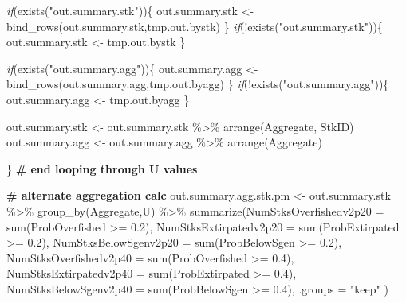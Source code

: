\documentclass[french,11pt]{book}
\newenvironment{Shaded}{\begin{snugshade}}{\end{snugshade}}
\newcommand{\AttributeTok}[1]{\textcolor[rgb]{0.77,0.63,0.00}{#1}}
\newcommand{\CommentTok}[1]{\textcolor[rgb]{0.56,0.35,0.01}{\textbf{#1}}}
\newcommand{\ControlFlowTok}[1]{\textcolor[rgb]{0.13,0.29,0.53}{\textit{#1}}}
\newcommand{\FloatTok}[1]{\textcolor[rgb]{0.00,0.00,0.81}{#1}}
\newcommand{\FunctionTok}[1]{\textcolor[rgb]{0.00,0.00,0.00}{#1}}
\newcommand{\NormalTok}[1]{#1}
\newcommand{\OtherTok}[1]{\textcolor[rgb]{0.56,0.35,0.01}{#1}}
\newcommand{\SpecialCharTok}[1]{\textcolor[rgb]{0.00,0.00,0.00}{#1}}
\newcommand{\StringTok}[1]{\textcolor[rgb]{0.31,0.60,0.02}{#1}}
\begin{document}
\begin{Shaded}
\begin{Highlighting}[]
    \ControlFlowTok{if}\NormalTok{(}\FunctionTok{exists}\NormalTok{(}\StringTok{"out.summary.stk"}\NormalTok{))\{ out.summary.stk }\OtherTok{\textless{}{-}} 
                       \FunctionTok{bind\_rows}\NormalTok{(out.summary.stk,tmp.out.bystk) \}}
  \ControlFlowTok{if}\NormalTok{(}\SpecialCharTok{!}\FunctionTok{exists}\NormalTok{(}\StringTok{"out.summary.stk"}\NormalTok{))\{ out.summary.stk }\OtherTok{\textless{}{-}}\NormalTok{ tmp.out.bystk \}}

  \ControlFlowTok{if}\NormalTok{(}\FunctionTok{exists}\NormalTok{(}\StringTok{"out.summary.agg"}\NormalTok{))\{ out.summary.agg }\OtherTok{\textless{}{-}} 
                       \FunctionTok{bind\_rows}\NormalTok{(out.summary.agg,tmp.out.byagg) \}}
  \ControlFlowTok{if}\NormalTok{(}\SpecialCharTok{!}\FunctionTok{exists}\NormalTok{(}\StringTok{"out.summary.agg"}\NormalTok{))\{ out.summary.agg }\OtherTok{\textless{}{-}}\NormalTok{ tmp.out.byagg \}}

\NormalTok{  out.summary.stk }\OtherTok{\textless{}{-}}\NormalTok{ out.summary.stk }\SpecialCharTok{\%\textgreater{}\%} \FunctionTok{arrange}\NormalTok{(Aggregate, StkID)}
\NormalTok{  out.summary.agg }\OtherTok{\textless{}{-}}\NormalTok{ out.summary.agg }\SpecialCharTok{\%\textgreater{}\%} \FunctionTok{arrange}\NormalTok{(Aggregate)}

\NormalTok{\} }\CommentTok{\# end looping through U values}

\CommentTok{\# alternate aggregation calc}
\NormalTok{out.summary.agg.stk.pm }\OtherTok{\textless{}{-}}\NormalTok{ out.summary.stk }\SpecialCharTok{\%\textgreater{}\%} \FunctionTok{group\_by}\NormalTok{(Aggregate,U) }\SpecialCharTok{\%\textgreater{}\%}
  \FunctionTok{summarize}\NormalTok{(}\AttributeTok{NumStksOverfishedv2p20 =} \FunctionTok{sum}\NormalTok{(ProbOverfished }\SpecialCharTok{\textgreater{}=} \FloatTok{0.2}\NormalTok{),}
            \AttributeTok{NumStksExtirpatedv2p20 =} \FunctionTok{sum}\NormalTok{(ProbExtirpated }\SpecialCharTok{\textgreater{}=} \FloatTok{0.2}\NormalTok{),}
            \AttributeTok{NumStksBelowSgenv2p20 =} \FunctionTok{sum}\NormalTok{(ProbBelowSgen }\SpecialCharTok{\textgreater{}=} \FloatTok{0.2}\NormalTok{),}
            \AttributeTok{NumStksOverfishedv2p40 =} \FunctionTok{sum}\NormalTok{(ProbOverfished }\SpecialCharTok{\textgreater{}=} \FloatTok{0.4}\NormalTok{),}
            \AttributeTok{NumStksExtirpatedv2p40 =} \FunctionTok{sum}\NormalTok{(ProbExtirpated }\SpecialCharTok{\textgreater{}=} \FloatTok{0.4}\NormalTok{),}
            \AttributeTok{NumStksBelowSgenv2p40 =} \FunctionTok{sum}\NormalTok{(ProbBelowSgen }\SpecialCharTok{\textgreater{}=} \FloatTok{0.4}\NormalTok{),}
            \AttributeTok{.groups =} \StringTok{"keep"}
\NormalTok{  )}


\end{Highlighting}
\end{Shaded}
\end{document}
